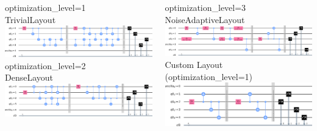 \documentclass[aspectratio=169,11pt,hyperref={colorlinks=true}]{beamer}
\begin{document}
\begin{frame}
    \begin{columns}
            \centering
            optimization\_level=1\\
            TrivialLayout\\
            \includegraphics[width=\textwidth, height=.6\textheight, keepaspectratio]{layout_1.png}\\
            optimization\_level=2\\
            DenseLayout\\
            \includegraphics[width=\textwidth, height=.6\textheight, keepaspectratio]{layout_2.png}

            \centering
            optimization\_level=3\\
            NoiseAdaptiveLayout\\
            \includegraphics[width=\textwidth, height=.6\textheight, keepaspectratio]{layout_3.png}\\
            Custom Layout\\
            (optimization\_level=1)\\
            \includegraphics[width=\textwidth, height=.6\textheight, keepaspectratio]{custom_layout.png}
    \end{columns}
\end{frame}
\end{document}

